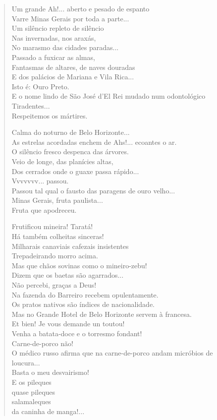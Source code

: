 \begin{verse}
Um grande Ah!... aberto e pesado de espanto\\
Varre Minas Gerais por toda a parte...\\
Um silêncio repleto de silêncio\\
Nas invernadas, nos araxás,\\
No marasmo das cidades paradas...\\
Passado a fuxicar as almas,\\
Fantasmas de altares, de naves douradas\\
E dos palácios de Mariana e Vila Rica...\\
\quad\quad{}Isto é: Ouro Preto.\\
E o nome lindo de São José d'El Rei mudado num odontológico Tiradentes...\\
Respeitemos os mártires.

Calma do noturno de Belo Horizonte...\\
As estrelas acordadas enchem de Ahs!... ecoantes o ar.\\
O silêncio fresco despenca das árvores.\\
Veio de longe, das planícies altas,\\
Dos cerrados onde o guaxe passa rápido...\\
Vvvvvvv... passou.\\
Passou tal qual o fausto das paragens de ouro velho...\\
Minas Gerais, fruta paulista...\\
Fruta que apodreceu.

Frutificou mineira! Taratá!\\
Há também colheitas sinceras!\\
Milharais canaviais cafezais insistentes\\
Trepadeirando morro acima.\\
Mas que chãos sovinas como o mineiro-zebu!\\
Dizem que os baetas são agarrados...\\
Não percebi, graças a Deus!\\
Na fazenda do Barreiro recebem opulentamente.\\
Os pratos nativos são índices de nacionalidade.\\
Mas no Grande Hotel de Belo Horizonte servem à francesa.\\
Et bien! Je vous demande un toutou!\\
Venha a batata-doce e o torresmo fondant!\\
Carne-de-porco não!\\
O médico russo afirma que na carne-de-porco andam micróbios de loucura...\\
Basta o meu desvairismo!\\
E os pileques\\
\quad\quad{}quase pileques\\
\quad\quad\quad{}salamaleques\\
\quad\quad\quad\quad{}da caninha de manga!...


\end{verse}
